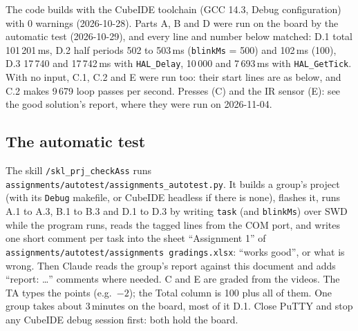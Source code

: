 \documentclass[11pt,a4paper]{article}
\newcommand{\lv}[1]{\texttt{#1}}                 %
\begin{document}
The code builds with the CubeIDE toolchain (GCC 14.3, Debug configuration) with 0 warnings (2026-10-28). Parts A,
B and D were run on the board by the automatic test (2026-10-29), and every line and number below matched: D.1 total
101\,201\,ms, D.2 half periods 502 to 503\,ms (\lv{blinkMs} = 500) and 102\,ms (100), D.3 17\,740 and 17\,742\,ms
with \texttt{HAL\_Delay}, 10\,000 and 7\,693\,ms with \texttt{HAL\_GetTick}. With no input, C.1, C.2 and E were run
too: their start lines are as below, and C.2 makes 9\,679 loop passes per second. Presses (C) and the IR sensor (E): see the
good solution's report, where they were run on 2026-11-04.

\subsection{The automatic test}
The skill \texttt{/skl\_prj\_checkAss} runs \texttt{assignments/autotest/assignments\_autotest.py}. It builds a
group's project (with its \texttt{Debug} makefile, or CubeIDE headless if there is none), flashes it, runs A.1 to A.3,
B.1 to B.3 and D.1 to D.3 by writing \lv{task} (and \lv{blinkMs}) over SWD while the program runs, reads the tagged
lines from the COM port, and writes one short comment per task into the sheet ``Assignment 1'' of
\texttt{assignments/autotest/assignments gradings.xlsx}: ``works good'', or what is wrong. Then Claude reads the
group's report against this document and adds ``report: \ldots'' comments where needed. C and E are graded from the
videos. The TA types the points (e.g.\ $-2$); the Total column is 100 plus all of them. One group takes about
3\,minutes on the board, most of it D.1. Close PuTTY and stop any CubeIDE debug session first: both hold the board.
\end{document}
